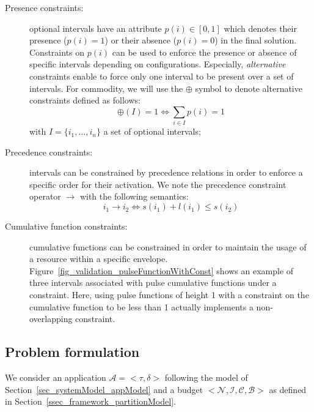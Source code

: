 \documentclass[main.tex]{subfiles}
\begin{document}
\begin{description}

    \item[Presence constraints: ] optional intervals have an attribute $p(i)
        \in [0,1]$ which denotes their presence ($p(i)=1$) or their absence
        ($p(i)=0$) in the final solution. Constraints on $p(i)$ can be used to
        enforce the presence or absence of specific intervals depending on
        configurations. Especially, \emph{alternative} constraints enable to
        force only one interval to be present over a set of intervals. For
        commodity, we will use the $\oplus$ symbol to denote alternative
        constraints defined as follows:
        \begin{displaymath}
            \oplus(I)=1 \Leftrightarrow \underset{i \in I}{\sum} p(i) = 1
        \end{displaymath}
        with $I =  \{ i_1 , \ldots , i_n \}$ a set of optional intervals;

    \item[Precedence constraints: ] intervals can be constrained by precedence
        relations in order to enforce a specific order for their activation. We
        note the precedence constraint operator $ \to $ with the following
        semantics:
        \begin{displaymath}
            i_1 \to i_2 \Leftrightarrow s(i_1) + l(i_1) \leq s(i_2)
        \end{displaymath}

    \item[Cumulative function constraints: ] cumulative functions can be
        constrained in order to maintain the usage of a resource within a
        specific envelope. Figure~\ref{fig_validation_pulseFunctionWithConst}
        shows an example of three intervals associated with pulse cumulative
        functions under a constraint. Here, using pulse functions of height 1
        with a constraint on the cumulative function to be less than 1 actually
        implements a non-overlapping constraint.
\end{description}

\subsection{Problem formulation}
We consider an application $\mathcal{A} = <\tau , \delta>$ following the model
of Section~\ref{sec_systemModel_appModel} and a budget $<\mathcal{N} ,
\mathcal{I} , \mathcal{C} , \mathcal{B} > $ as defined in
Section~\ref{ssec_framework_partitionModel}.
\end{document}
